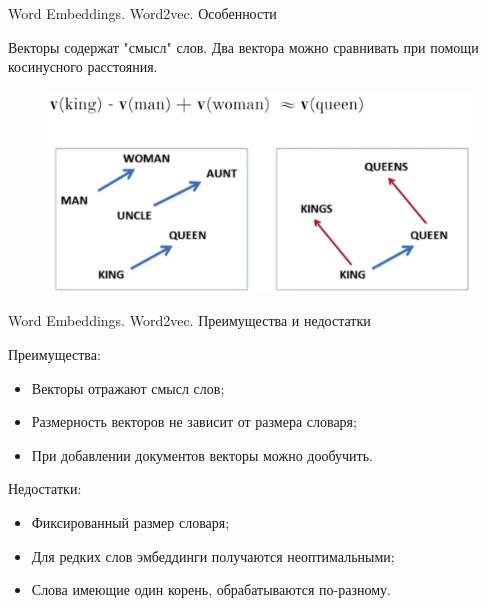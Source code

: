 \documentclass[notheorems, handout, 10pt]{beamer}
\begin{document}
	\begin{frame}{Word Embeddings. Word2vec. Особенности}
		
		Векторы содержат "смысл" слов. Два вектора можно сравнивать при помощи косинусного расстояния.
		
		\begin{figure}[H]
			\includegraphics[width=0.7\linewidth]{images/king}
		\end{figure}
				
		\note{
			
		}
		
	\end{frame}
	
	\begin{frame}{Word Embeddings. Word2vec. Преимущества и недостатки}
		
		Преимущества:
		\begin{itemize}
			\item Векторы отражают смысл слов;
			\item Размерность векторов не зависит от размера словаря;
			\item При добавлении документов векторы можно дообучить.
		\end{itemize}
		
		\vspace{0.2cm}
		
		Недостатки:
		\begin{itemize}
			\item Фиксированный размер словаря;
			\item Для редких слов эмбеддинги получаются неоптимальными;
			\item Слова имеющие один корень, обрабатываются по-разному.
		\end{itemize}
		
		\note{
			
		}
		
	\end{frame}
	
\end{document}
